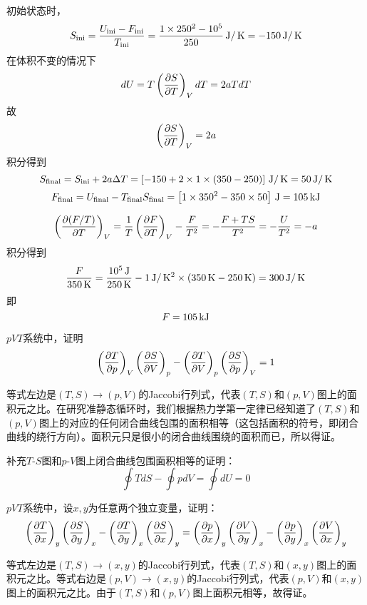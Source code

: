 \documentclass[CJK]{beamer}
\begin{document}
\begin{frame}
  \bch
  初始状态时，
  $$ S_{\rm ini} = \frac{U_{\rm ini}-F_{\rm ini}}{T_{\rm ini}} = \frac{1\times 250^2 - 10^5}{250} \,\mathrm{J}/\,\mathrm{K} = -150\,\mathrm{J}/\,\mathrm{K}$$
  在体积不变的情况下
  $$ dU = T\left(\frac{\partial S}{\partial T}\right)_{V} dT  =  2aTdT$$
  故
  $$ \left(\frac{\partial S}{\partial T}\right)_{V} = 2a $$
  积分得到
  $$ S_{\rm final}  = S_{\rm ini} + 2a\Delta T =  \left[-150 + 2\times 1\times (350-250) \right] \,\mathrm{J}/\,\mathrm{K} = 50 \,\mathrm{J}/\,\mathrm{K} $$
  $$ F_{\rm final} = U_{\rm final}-T_{\rm final}S_{\rm final} = \left[1\times 350^2 - 350\times 50\right] \,\mathrm{J} = 105\,\mathrm{kJ}$$
  
  \ech
\end{frame}

\begin{frame}
  \bch
  $$\left(\frac{\partial (F/T)}{\partial T}\right)_{V} = \frac{1}{T}\left(\frac{\partial F}{\partial T}\right)_{V} - \frac{F}{T^2} = -\frac{F+TS}{T^2} = -\frac{U}{T^2} = -a $$
  积分得到
  $$\frac{F}{350\,\mathrm{K}} = \frac{10^5\,\mathrm{J}}{250\,\mathrm{K}} - 1\,\mathrm{J}/\,\mathrm{K}^2\times(350\,\mathrm{K} - 250\,\mathrm{K}) = 300 \,\mathrm{J}/\,\mathrm{K}$$
  即
  $$F = 105 \,\mathrm{kJ}$$

  \ech
\end{frame}


\begin{frame}
  \bch
  $pVT$系统中，证明
  $$ \left(\frac{\partial T}{\partial p}\right)_{V} \left(\frac{\partial S}{\partial V}\right)_{p} - \left(\frac{\partial T}{\partial V}\right)_{p} \left(\frac{\partial S}{\partial p}\right)_{V} = 1 $$
  \ech
\end{frame}

\begin{frame}
  \bch
  等式左边是$(T,S)\rightarrow (p, V)$的Jaccobi行列式，代表$(T,S)$和$(p,V)$图上的面积元之比。在研究准静态循环时，我们根据热力学第一定律已经知道了$(T,S)$和$(p,V)$图上的对应的任何闭合曲线包围的面积相等（这包括面积的符号，即闭合曲线的绕行方向）。面积元只是很小的闭合曲线围绕的面积而已，所以得证。

  \skipline

  补充$T$-$S$图和$p$-$V$图上闭合曲线包围面积相等的证明：
$$ \oint TdS - \oint pdV = \oint dU = 0$$
  
  \ech
\end{frame}



\begin{frame}
  \bch
  $pVT$系统中，设$x, y$为任意两个独立变量，证明：
      {\small $$ \left(\frac{\partial T}{\partial x}\right)_{y} \left(\frac{\partial S}{\partial y}\right)_{x} - \left(\frac{\partial T}{\partial y}\right)_{x} \left(\frac{\partial S}{\partial x}\right)_{y} = \left(\frac{\partial p}{\partial x}\right)_{y} \left(\frac{\partial V}{\partial y}\right)_{x} - \left(\frac{\partial p}{\partial y}\right)_{x} \left(\frac{\partial V}{\partial x}\right)_{y} $$}  
  \ech
\end{frame}

\begin{frame}
  \bch
等式左边是$(T,S)\rightarrow (x, y)$的Jaccobi行列式，代表$(T,S)$和$(x,y)$图上的面积元之比。等式右边是$(p,V)\rightarrow (x, y)$的Jaccobi行列式，代表$(p,V)$和$(x,y)$图上的面积元之比。由于$(T,S)$和$(p,V)$图上面积元相等，故得证。
  \ech
\end{frame}
\end{document}

